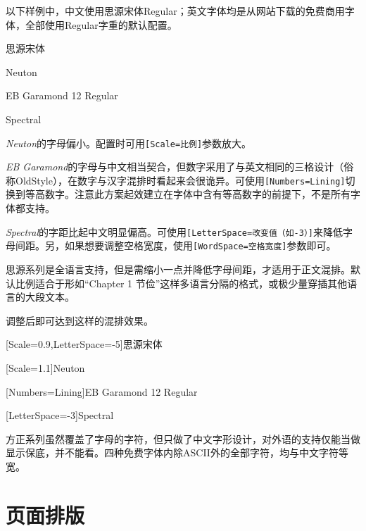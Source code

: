 \documentclass[10pt,openany]{book}
\begin{document}
\begin{sloppypar}
以下样例中，中文使用思源宋体Regular；英文字体均是从网站下载的免费商用字体，全部使用Regular字重的默认配置。

\begin{adjustwidth}{2em}{2em}
    \large\blankpar

    思源宋体\testtext

    Neuton\testtext

    EB Garamond 12 Regular\testtext

    Spectral\testtext

    \blankpar
\end{adjustwidth}

\textit{Neuton}的字母偏小。配置时可用\texttt{{[}Scale=比例{]}}参数放大。

\textit{EB Garamond}的字母与中文相当契合，但数字采用了与英文相同的三格设计（俗称OldStyle），在数字与汉字混排时看起来会很诡异。可使用\texttt{{[}Numbers=Lining{]}}切换到等高数字。注意此方案起效建立在字体中含有等高数字的前提下，不是所有字体都支持。

\textit{Spectral}的字距比起中文明显偏高。可使用\texttt{{[}LetterSpace=改变值（如-3）{]}}来降低字母间距。另，如果想要调整空格宽度，使用\texttt{{[}WordSpace=空格宽度{]}}参数即可。

思源系列是全语言支持，但是需缩小一点并降低字母间距，才适用于正文混排。默认比例适合于形如“Chapter 1 节俭”这样多语言分隔的格式，或极少量穿插其他语言的大段文本。

调整后即可达到这样的混排效果。

\begin{adjustwidth}{2em}{2em}
    \large\blankpar

    [Scale=0.9,LetterSpace=-5]思源宋体\testtext

    [Scale=1.1]Neuton\testtext

    [Numbers=Lining]EB Garamond 12 Regular\testtext

    [LetterSpace=-3]Spectral\testtext

    \blankpar
\end{adjustwidth}

方正系列虽然覆盖了字母的字符，但只做了中文字形设计，对外语的支持仅能当做显示保底，并不能看。四种免费字体内除ASCII外的全部字符，均与中文字符等宽。

\chapter{页面排版}


\end{sloppypar}
\end{document}
